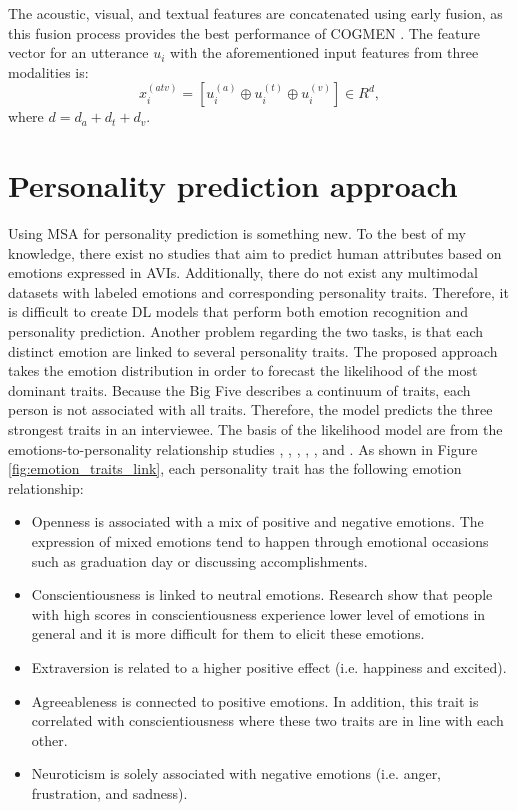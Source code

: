 The acoustic, visual, and textual features are concatenated using early fusion, as this fusion process provides the best performance of COGMEN \cite{COGMEN_joshi-etal-2022-cogmen}. The feature vector for an utterance $u_{i}$ with the aforementioned input features from three modalities is:
%
\begin{equation*}
    x_{i}^{(atv)} = [u_{i}^{(a)} \oplus u_{i}^{(t)} \oplus u_{i}^{(v)}] \in R^{d},\tag{17}
\end{equation*}
%
where $d = d_{a} + d_{t} + d_{v}$. 

\section{Personality prediction approach}
\label{sec:personality_prediction_approach}
Using MSA for personality prediction is something new. To the best of my knowledge, there exist no studies that aim to predict human attributes based on emotions expressed in AVIs. Additionally, there do not exist any multimodal datasets with labeled emotions and corresponding personality traits. Therefore, it is difficult to create DL models that perform both emotion recognition and personality prediction. Another problem regarding the two tasks, is that each distinct emotion are linked to several personality traits. The proposed approach takes the emotion distribution in order to forecast the likelihood of the most dominant traits. Because the Big Five describes a continuum of traits, each person is not associated with all traits. Therefore, the model predicts the three strongest traits in an interviewee. The basis of the likelihood model are from the emotions-to-personality relationship studies \cite{personality-and-emotion-revelle2009personality},  \cite{extraversion1-komulainen2014effect}, \cite{personality_emotions_link}, \cite{personality1-deyoung2007between}, \cite{personality2-9210819}, and \cite{emotion_personalty_correlation_Zhao2018}. As shown in Figure \ref{fig:emotion_traits_link}, each personality trait has the following emotion relationship:
%
\begin{itemize}
    \item Openness is associated with a mix of positive and negative emotions. The expression of mixed emotions tend to happen through emotional occasions such as graduation day or discussing accomplishments. \\
    \item Conscientiousness is linked to neutral emotions. Research show that people with high scores in conscientiousness experience lower level of emotions in general and it is more difficult for them to elicit these emotions. \\
    \item Extraversion is related to a higher positive effect (i.e. happiness and excited). \\
    \item Agreeableness is connected to positive emotions. In addition, this trait is correlated with conscientiousness where these two traits are in line with each other. \\
    \item Neuroticism is solely associated with negative emotions (i.e. anger, frustration, and sadness).
\end{itemize}
